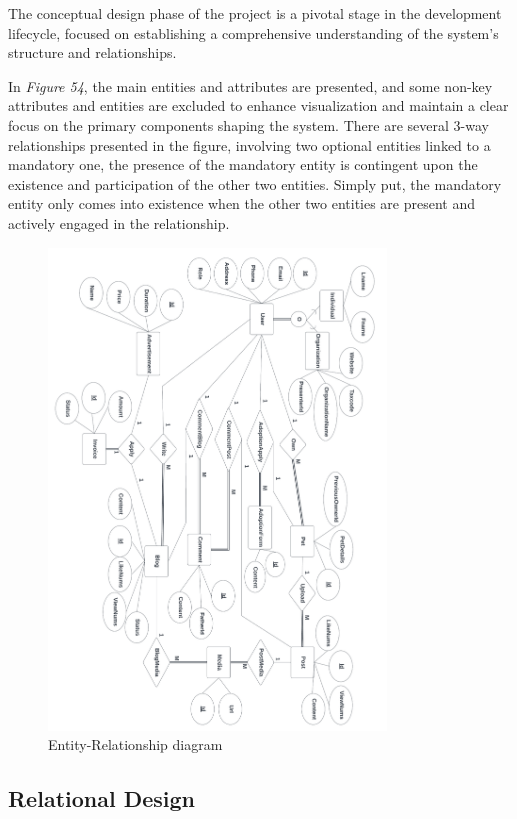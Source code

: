 The conceptual design phase of the project is a pivotal stage in the development lifecycle, focused on establishing a comprehensive understanding of the system's structure and relationships.


In \emph{Figure 54}, the main entities and attributes are presented, and
some non-key attributes and entities are excluded to enhance
visualization and maintain a clear focus on the primary components
shaping the system. There are several 3-way relationships presented in
the figure, involving two optional entities linked to a mandatory one,
the presence of the mandatory entity is contingent upon the existence
and participation of the other two entities. Simply put, the mandatory
entity only comes into existence when the other two entities are present
and actively engaged in the relationship.

\begin{figure}[H]
    \centering
    \includegraphics[width=0.8\textwidth]{Figures/erd.png}
    \caption{Entity-Relationship diagram}
\end{figure}
\clearpage

\subsection{Relational Design}


